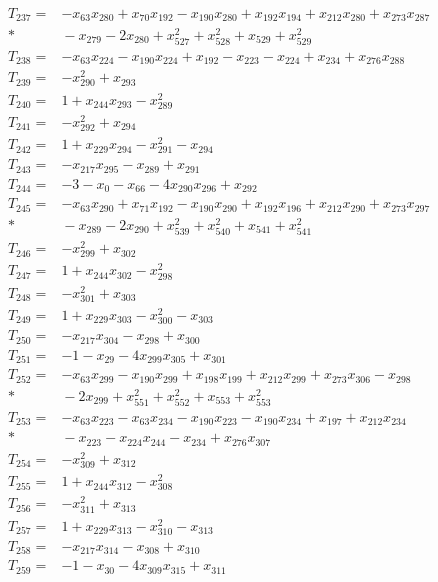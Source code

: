 \begin{align*}
T_{237}={}&-x_{63}x_{280}+x_{70}x_{192}-x_{190}x_{280}+x_{192}x_{194}+x_{212}x_{280}+x_{273}x_{287}\\*
&{}-x_{279}-2x_{280}+x_{527}^{2}+x_{528}^{2}+x_{529}+x_{529}^{2}\\[3pt]
T_{238}={}&-x_{63}x_{224}-x_{190}x_{224}+x_{192}-x_{223}-x_{224}+x_{234}+x_{276}x_{288}\\[3pt]
T_{239}={}&-x_{290}^{2}+x_{293}\\[3pt]
T_{240}={}&1+x_{244}x_{293}-x_{289}^{2}\\[3pt]
T_{241}={}&-x_{292}^{2}+x_{294}\\[3pt]
T_{242}={}&1+x_{229}x_{294}-x_{291}^{2}-x_{294}\\[3pt]
T_{243}={}&-x_{217}x_{295}-x_{289}+x_{291}\\[3pt]
T_{244}={}&-3-x_{0}-x_{66}-4x_{290}x_{296}+x_{292}\\[3pt]
T_{245}={}&-x_{63}x_{290}+x_{71}x_{192}-x_{190}x_{290}+x_{192}x_{196}+x_{212}x_{290}+x_{273}x_{297}\\*
&{}-x_{289}-2x_{290}+x_{539}^{2}+x_{540}^{2}+x_{541}+x_{541}^{2}\\[3pt]
T_{246}={}&-x_{299}^{2}+x_{302}\\[3pt]
T_{247}={}&1+x_{244}x_{302}-x_{298}^{2}\\[3pt]
T_{248}={}&-x_{301}^{2}+x_{303}\\[3pt]
T_{249}={}&1+x_{229}x_{303}-x_{300}^{2}-x_{303}\\[3pt]
T_{250}={}&-x_{217}x_{304}-x_{298}+x_{300}\\[3pt]
T_{251}={}&-1-x_{29}-4x_{299}x_{305}+x_{301}\\[3pt]
T_{252}={}&-x_{63}x_{299}-x_{190}x_{299}+x_{198}x_{199}+x_{212}x_{299}+x_{273}x_{306}-x_{298}\\*
&{}-2x_{299}+x_{551}^{2}+x_{552}^{2}+x_{553}+x_{553}^{2}\\[3pt]
T_{253}={}&-x_{63}x_{223}-x_{63}x_{234}-x_{190}x_{223}-x_{190}x_{234}+x_{197}+x_{212}x_{234}\\*
&{}-x_{223}-x_{224}x_{244}-x_{234}+x_{276}x_{307}\\[3pt]
T_{254}={}&-x_{309}^{2}+x_{312}\\[3pt]
T_{255}={}&1+x_{244}x_{312}-x_{308}^{2}\\[3pt]
T_{256}={}&-x_{311}^{2}+x_{313}\\[3pt]
T_{257}={}&1+x_{229}x_{313}-x_{310}^{2}-x_{313}\\[3pt]
T_{258}={}&-x_{217}x_{314}-x_{308}+x_{310}\\[3pt]
T_{259}={}&-1-x_{30}-4x_{309}x_{315}+x_{311}\\[3pt]

\end{align*}

